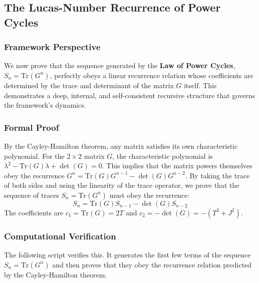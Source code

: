 \subsection{The Lucas-Number Recurrence of Power Cycles}
\subsubsection*{Framework Perspective}
We now prove that the sequence generated by the \textbf{Law of Power Cycles}, $S_n = \text{Tr}(G^n)$, perfectly obeys a linear recurrence relation whose coefficients are determined by the trace and determinant of the matrix $G$ itself. This demonstrates a deep, internal, and self-consistent recursive structure that governs the framework's dynamics.

\subsubsection*{Formal Proof}
By the Cayley-Hamilton theorem, any matrix satisfies its own characteristic polynomial. For the $2 \times 2$ matrix $G$, the characteristic polynomial is $\lambda^2 - \text{Tr}(G)\lambda + \det(G) = 0$. This implies that the matrix powers themselves obey the recurrence $G^n = \text{Tr}(G)G^{n-1} - \det(G)G^{n-2}$. By taking the trace of both sides and using the linearity of the trace operator, we prove that the sequence of traces $S_n = \text{Tr}(G^n)$ must obey the recurrence:
$$ S_n = \text{Tr}(G) S_{n-1} - \det(G) S_{n-2} $$
The coefficients are $c_1 = \text{Tr}(G) = 2T$ and $c_2 = -\det(G) = -(T^2+J^2)$.

\subsubsection*{Computational Verification}
The following script verifies this. It generates the first few terms of the sequence $S_n = \text{Tr}(G^n)$ and then proves that they obey the recurrence relation predicted by the Cayley-Hamilton theorem.

